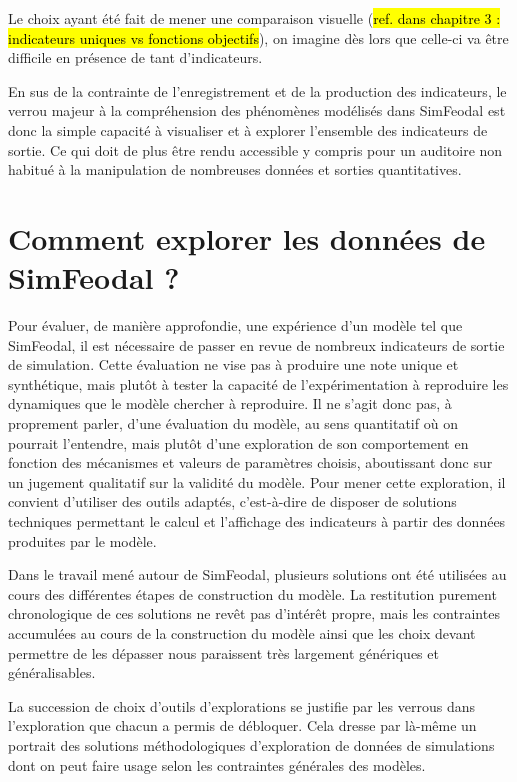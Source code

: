 	Le choix ayant été fait de mener une comparaison visuelle (\hl{ref. dans chapitre 3 : indicateurs uniques vs fonctions objectifs}), on imagine dès lors que celle-ci va être difficile en présence de tant d'indicateurs.

	En sus de la contrainte de l'enregistrement et de la production des indicateurs, le verrou majeur à la compréhension des phénomènes modélisés dans SimFeodal est donc la simple capacité à visualiser et à explorer l'ensemble des indicateurs de sortie.
	Ce qui doit de plus être rendu accessible y compris pour un auditoire non habitué à la manipulation de nombreuses données et sorties quantitatives.

\clearpage
\section[Comment explorer les données de SimFeodal ?]{Comment explorer les données de SimFeodal ?%
}\label{sec:explorer-sorties-simfeodal}

	Pour évaluer, de manière approfondie, une expérience d'un modèle tel que SimFeodal, il est nécessaire de passer en revue de nombreux indicateurs de sortie de simulation.
	Cette évaluation ne vise pas à produire une \og note\fg{} unique et synthétique, mais plutôt à tester la capacité de l'expérimentation à reproduire les dynamiques que le modèle chercher à reproduire.
	Il ne s'agit donc pas, à proprement parler, d'une évaluation du modèle, au sens quantitatif où on pourrait l'entendre, mais plutôt d'une exploration de son comportement en fonction des mécanismes et valeurs de paramètres choisis, aboutissant donc sur un jugement qualitatif sur la validité du modèle.
	Pour mener cette exploration, il convient d'utiliser des outils adaptés, c'est-à-dire de disposer de solutions techniques permettant le calcul et l'affichage des indicateurs à partir des données produites par le modèle.
	
	Dans le travail mené autour de SimFeodal, plusieurs solutions ont été utilisées au cours des différentes étapes de construction du modèle.
	La restitution purement chronologique de ces solutions ne revêt pas d'intérêt propre, mais les contraintes accumulées au cours de la construction du modèle ainsi que les choix devant permettre de les dépasser nous paraissent très largement génériques et généralisables.
	
	La succession de choix d'outils d'explorations se justifie par les verrous dans l'exploration que chacun a permis de débloquer.
	Cela dresse par là-même un portrait des solutions méthodologiques d'exploration de données de simulations dont on peut faire usage selon les contraintes générales des modèles.

